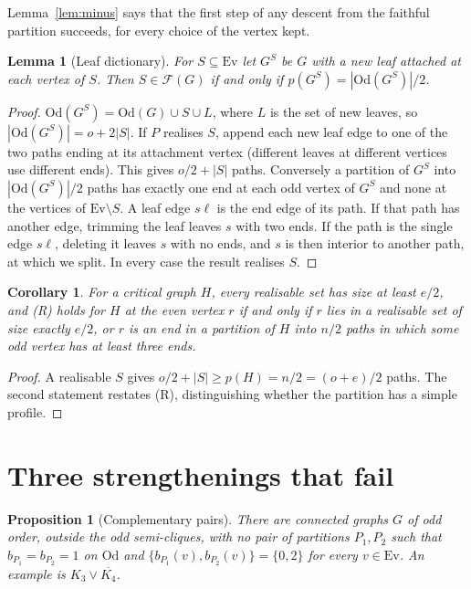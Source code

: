 \documentclass[11pt]{amsart}
\newtheorem{lemma}[theorem]{Lemma}
\newtheorem{proposition}[theorem]{Proposition}
\newtheorem{corollary}[theorem]{Corollary}
\theoremstyle{definition}
\newcommand{\cF}{\mathcal F}
\newcommand{\Ev}{\mathrm{Ev}}
\newcommand{\Od}{\mathrm{Od}}
\begin{document}
Lemma~\ref{lem:minus} says that the first step of any descent from the faithful partition succeeds,
for every choice of the vertex kept.

\begin{lemma}[Leaf dictionary]\label{lem:dict}
For $S\subseteq\Ev$ let $G^S$ be $G$ with a new leaf attached at each vertex of $S$. Then $S\in\cF(G)$
if and only if $p(G^S)=|\Od(G^S)|/2$.
\end{lemma}

\begin{proof}
$\Od(G^S)=\Od(G)\cup S\cup L$, where $L$ is the set of new leaves, so $|\Od(G^S)|=o+2|S|$. If $P$
realises $S$, append each new leaf edge to one of the two paths ending at its attachment vertex
(different leaves at different vertices use different ends). This gives $o/2+|S|$ paths. Conversely a
partition of $G^S$ into $|\Od(G^S)|/2$ paths has exactly one end at each odd vertex of $G^S$ and none at
the vertices of $\Ev\setminus S$. A leaf edge $s\ell$ is the end edge of its path. If that path has
another edge, trimming the leaf leaves $s$ with two ends. If the path is the single edge $s\ell$,
deleting it leaves $s$ with no ends, and $s$ is then interior to another path, at which we split. In
every case the result realises $S$.
\end{proof}

\begin{corollary}\label{cor:R}
For a critical graph $H$, every realisable set has size at least $e/2$, and (R) holds for $H$ at the
even vertex $r$ if and only if $r$ lies in a realisable set of size exactly $e/2$, or $r$ is an end in
a partition of $H$ into $n/2$ paths in which some odd vertex has at least three ends.
\end{corollary}

\begin{proof}
A realisable $S$ gives $o/2+|S|\ge p(H)=n/2=(o+e)/2$ paths. The second statement restates (R),
distinguishing whether the partition has a simple profile.
\end{proof}

\section{Three strengthenings that fail}

\begin{proposition}[Complementary pairs]\label{prop:cp}
There are connected graphs $G$ of odd order, outside the odd semi-cliques, with no pair of partitions
$P_1,P_2$ such that $b_{P_1}=b_{P_2}=1$ on $\Od$ and $\{b_{P_1}(v),b_{P_2}(v)\}=\{0,2\}$ for every
$v\in\Ev$. An example is $K_3\vee \overline{K_4}$.
\end{proposition}
\end{document}
